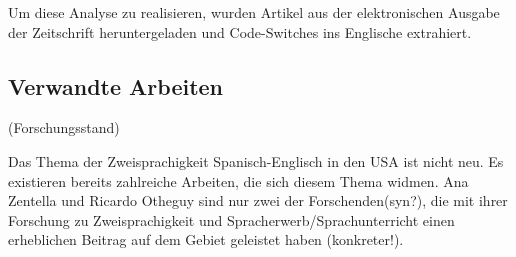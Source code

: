 Um diese Analyse zu realisieren, wurden Artikel aus der elektronischen Ausgabe der Zeitschrift heruntergeladen und Code-Switches ins Englische extrahiert.


\begin{comment}
Pregunta
--------
Vull investigar si l'altre idioma es fa servir en contextos específics.
La suposició inicial és que sí, que si tenim un text escrit principalment en castellà, trobarem expresions en anglès en casos especials,
per exemple per designar termes tècnincs o frases fixes que no en tenen una traducció exacta en castellà.
Esperem també que observarem la tendecia inversa: que les frases fixes del castellà es mantenen en textos angleses.
Un altre cas de mantenir l'idioma "original" seria si es tracte de coses típiques d'una regió que no es poden trobar als llocs on es parla l'altre idioma (per exemple plantes, animals, menjar, etc.).
A més a més, seria interessant observar si frases de "l'altra llengua" s'utilitzan a causa de tenir un estatut més "alt" o amb l'objectiu de vender un producte.

Vinculació a la investigació existent
------------------------------------
El tema del billingüísme castellà-anglès als Estats Units no és nou i ja existeixen bastants treballs que investigan aquest fenomen.
Per exemple la investigació d'Ana Zentella i Ricardo Otheguy es va concentrar massa al billingüisme i l'ensenyament,
als diferents processos que ocorren en casos de coexistència de més d'una llengua.
Tanmateix, seria interessant examinar de quina manera els mitjans de comunicació (i en aquest cas concret, les revistes feminines) utilitzan dos codis i,
d'aixó intentar a concloure quin és l'objectiu que persegueixin.

------------------------------------

\end{comment}

\subsection{Verwandte Arbeiten}
(Forschungsstand)

Das Thema der Zweisprachigkeit Spanisch-Englisch in den USA ist nicht neu.
Es existieren bereits zahlreiche Arbeiten, die sich diesem Thema widmen.
Ana Zentella und Ricardo Otheguy sind nur zwei der Forschenden(syn?), die mit ihrer Forschung zu Zweisprachigkeit und Spracherwerb/Sprachunterricht einen erheblichen Beitrag auf dem Gebiet geleistet haben (konkreter!).

